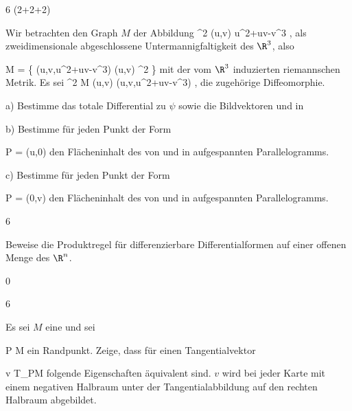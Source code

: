 {6 (2+2+2)}
{

Wir betrachten den Graph $M$ der Abbildung
\maabbeledisp {\varphi} {\R^2} {\R
} {(u,v)} { u^2+uv-v^3
} {,} als zweidimensionale abgeschlossene Untermannigfaltigkeit des $\R^3$, also

\mavergleichskettedisp
{\vergleichskette
{ M
}
{ =} { \left\{ (u,v,u^2+uv-v^3)  \mid  (u,v) \in \R^2         \right\}
}
{ } {
}
{ } {
}
{ } {
}
}
{}{}{}
mit der vom $\R^3$ induzierten riemannschen Metrik. Es sei
\maabbeledisp {\psi} {\R^2} { M
} {(u,v)} { (u,v,u^2+uv-v^3)
} {,}
die zugehörige Diffeomorphie.

a) Bestimme das totale Differential zu $\psi$ sowie die Bildvektoren
 und
 in

b) Bestimme für jeden Punkt der Form

\mavergleichskette
{\vergleichskette
{ P
}
{ = }{ (u,0)
}
{  }{
}
{    }{
}
{   }{
}
}
{}{}{}
den Flächeninhalt des von
 und
 in
 aufgespannten Parallelogramms.

c) Bestimme für jeden Punkt der Form

\mavergleichskette
{\vergleichskette
{ P
}
{ = }{ (0,v)
}
{  }{
}
{    }{
}
{   }{
}
}
{}{}{}
den Flächeninhalt des von
 und
 in
 aufgespannten Parallelogramms.

}
{} {}

{6}
{

Beweise die Produktregel für differenzierbare Differentialformen auf einer offenen Menge des $\R^n$.

}
{} {}

{0}
{

}
{} {}

{6}
{

Es sei $M$ eine
und sei

\mavergleichskette
{\vergleichskette
{ P
}
{ \in }{ \partial M
}
{  }{
}
{    }{
}
{   }{
}
}
{}{}{}
ein Randpunkt. Zeige, dass für einen Tangentialvektor

\mavergleichskette
{\vergleichskette
{ v
}
{ \in }{ T_PM
}
{  }{
}
{    }{
}
{   }{
}
}
{}{}{}
folgende Eigenschaften äquivalent sind.
 { $v$ wird bei jeder Karte mit einem negativen Halbraum unter der Tangentialabbildung auf den rechten Halbraum abgebildet.
}

}
{} {}

